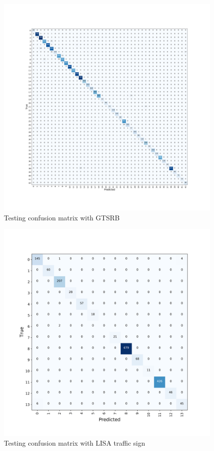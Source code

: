 \documentclass[conference]{IEEEtran}
\begin{document}
\begin{figure}[H]
\centering
  \begin{minipage}{.3\textwidth}
    \centering
    \includegraphics[width=1.0\linewidth]{confusion_matrix_f.png}
    \caption{Testing confusion matrix with GTSRB}
    \label{fig:fig_1}
  \end{minipage}
\end{figure}
\begin{figure}[H]
\centering
  \begin{minipage}{.3\textwidth}
    \centering
    \includegraphics[width=1.0\linewidth]{confusion_matrix.png}
    \caption{Testing confusion matrix with LISA traffic sign}
    \label{fig:fig_1}
  \end{minipage}
\end{figure}
\end{document}
